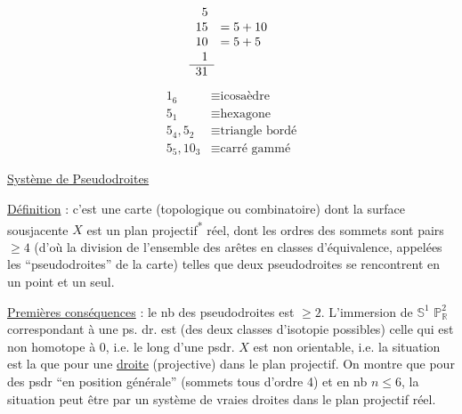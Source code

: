 \[
\begin{array}{rl}
5 &\\
15 &=5+10\\
10 &=5+5\\
1 &\\ \cline{1-1}
31 &
\end{array}
\]
\[
\begin{aligned}
1_6&\equiv\text{icosaèdre}\\
5_1&\equiv\text{hexagone}\\
5_4,5_2&\equiv\text{triangle bordé}\\
5_5,10_3&\equiv\text{carré gammé}
\end{aligned}
\]

\uline{Système de Pseudodroites}

\uline{Définition} : c'est une carte (topologique ou combinatoire)
dont la surface sousjacente $X$ est un plan projectif\textsuperscript{*}
réel, dont les ordres des sommets sont pairs $\geq4$ (d'où
la division de l'ensemble des arêtes en classes
d'équivalence, appelées les ``pseudodroites'' de la
carte) telles que deux pseudodroites se rencontrent
en un point et un seul.

\uline{Premières conséquences} : le nb  des pseudodroites est $\geq2$.
L'immersion de $\mathbb{S}^1$  $\mathbb{P}_{\mathbb{R}}^2$ correspondant à une
ps. dr. est (des deux classes d'isotopie possibles) celle
qui est non homotope à  $0$, i.e. le long d'une
psdr. $X$ est non orientable, i.e. la situation est la
 que pour une \uline{droite} (projective) dans le plan
projectif. On montre que pour des psdr ``en
position générale'' (sommets tous d'ordre 4) et
en nb $n\leq6$, la situation peut être  par
un système de vraies droites dans le plan
projectif réel.

